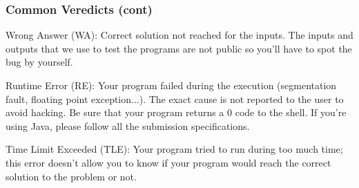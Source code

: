 \documentclass{beamer}
\begin{document}
\begin{frame}
	\frametitle {Common Veredicts (cont)}
	
	\begin{block}{Wrong Answer (WA):}
	Correct solution not reached for the inputs. 
	The inputs and outputs that we use to test the programs are not public so you'll have to spot the bug by yourself.
	\end{block}
	
	\begin{block}{Runtime Error (RE):}
	Your program failed during the execution (segmentation fault, floating point exception...). The exact cause is not reported to the user to avoid hacking. Be sure that your program returns a 0 code to the shell. If you're using Java, please follow all the submission specifications.
	\end{block}
	
	\begin{block}{Time Limit Exceeded (TLE):}
	Your program tried to run during too much time; this error doesn't allow you to know if your program would reach the correct solution to the problem or not.
	\end{block}
	
\end{frame}
	
	
	
	
	

%	
	
\end{document}

